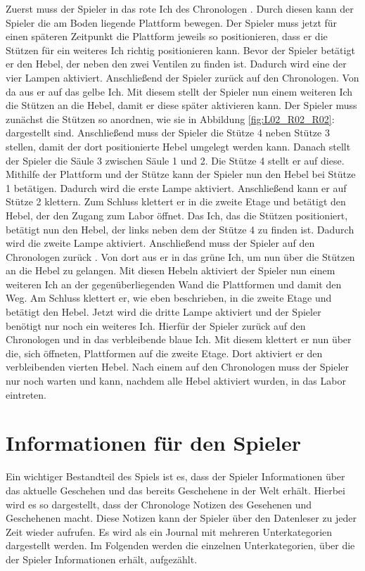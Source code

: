 Zuerst muss der Spieler in das rote Ich des Chronologen . Durch diesen kann der Spieler die am Boden liegende Plattform bewegen. Der Spieler muss jetzt für einen späteren Zeitpunkt die Plattform jeweils so positionieren, dass er die Stützen für ein weiteres Ich richtig positionieren kann. Bevor der Spieler  betätigt er den Hebel, der neben den zwei Ventilen zu finden ist. Dadurch wird eine der vier Lampen aktiviert. Anschließend  der Spieler zurück auf den Chronologen. Von da aus  er auf das gelbe Ich. Mit diesem stellt der Spieler nun einem weiteren Ich die Stützen an die Hebel, damit er diese später aktivieren kann. Der Spieler muss zunächst die Stützen so anordnen, wie sie in Abbildung \ref{fig:L02_R02_R02}:  dargestellt sind. Anschließend muss der Spieler die Stütze 4 neben Stütze 3 stellen, damit der dort positionierte Hebel umgelegt werden kann. Danach stellt der Spieler die Säule 3 zwischen Säule 1 und 2. Die Stütze 4 stellt er auf diese. Mithilfe der Plattform und der Stütze kann der Spieler nun den Hebel bei Stütze 1 betätigen. Dadurch wird die erste Lampe aktiviert. Anschließend kann er auf Stütze 2 klettern. Zum Schluss klettert er in die zweite Etage und betätigt den Hebel, der den Zugang zum Labor öffnet. Das Ich, das die Stützen positioniert, betätigt nun den Hebel, der links neben dem der Stütze 4 zu finden ist. Dadurch wird die zweite Lampe aktiviert.
Anschließend muss der Spieler auf den Chronologen zurück . Von dort aus  er in das grüne Ich, um nun über die Stützen an die Hebel zu gelangen. Mit diesen Hebeln aktiviert der Spieler nun einem weiteren Ich an der gegenüberliegenden Wand die Plattformen und damit den Weg. Am Schluss klettert er, wie eben beschrieben, in die zweite Etage und betätigt den Hebel. Jetzt wird die dritte Lampe aktiviert und der Spieler benötigt nur noch ein weiteres Ich.
Hierfür  der Spieler zurück auf den Chronologen und  in das verbleibende blaue Ich. Mit diesem klettert er nun über die, sich öffneten, Plattformen auf die zweite Etage. Dort aktiviert er den verbleibenden vierten Hebel. Nach einem  auf den Chronologen muss der Spieler nur noch warten und kann, nachdem alle Hebel aktiviert wurden, in das Labor eintreten.


\section{Informationen für den Spieler}
Ein wichtiger Bestandteil des Spiels ist es, dass der Spieler Informationen über das aktuelle Geschehen und das bereits Geschehene in der Welt erhält. Hierbei wird es so dargestellt, dass der Chronologe Notizen des Gesehenen und Geschehenen macht. Diese Notizen kann der Spieler über den Datenleser zu jeder Zeit wieder aufrufen. Es wird als ein Journal mit mehreren Unterkategorien dargestellt werden. 
Im Folgenden werden die einzelnen Unterkategorien, über die der Spieler Informationen erhält, aufgezählt.

